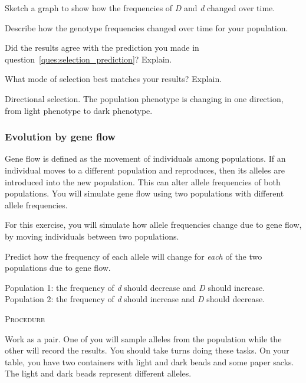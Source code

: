 \documentclass[12pt]{exam}
\newcommand*\AnswerBox[2]{%
    \parbox[t][#1]{0.92\textwidth}{%
    \begin{solution}#2\end{solution}}
    \vspace{\stretch{1}}
}
\newlength{\basespace}
\newcommand{\allele}[1]{\textit{#1}}
\begin{document}
\begin{questions}
\newpage

\question
Sketch a graph to show how the frequencies of \allele{D} and \allele{d} changed over time.

\AnswerBox{1.2\basespace}{%
}

\question
Describe how the genotype frequencies changed over time for your population.

\AnswerBox{0.8\basespace}{%
}

\question
Did the results agree with the prediction you made in question~\ref{ques:selection_prediction}? Explain.

\AnswerBox{0.8\baselineskip}{%
}

\question[Checkout]
What mode of selection best matches your results? Explain.

\AnswerBox{0\baselineskip}{Directional selection. The population phenotype is changing in one direction, from light phenotype to dark phenotype.}

\subsubsection*{Evolution by gene flow}\label{sec:gene_flow}

Gene flow is defined as the movement of individuals among populations.  If an individual moves to a different population and reproduces, then its alleles are introduced into the new population.  This can alter allele frequencies of both populations. You will simulate gene flow using two populations with different allele frequencies.

For this exercise, you will simulate how allele frequencies change due to gene flow, by moving individuals between two populations. 



\question\label{ques:migration_prediction}
Predict how the frequency of each allele will change for \emph{each} of the two populations due to gene flow. 

\AnswerBox{3\baselineskip}{Population 1: the frequency of \allele{d} should decrease and \allele{D} should increase. Population 2: the frequency of \allele{d} should increase and \allele{D} should decrease.}

\textsc{Procedure}

\medskip

Work as a pair. One of you will sample alleles from the population while the other will record the results. You should take turns doing these tasks.  On your table, you have two containers with light and dark beads and some paper sacks. The light and dark beads represent different alleles.


\end{questions}
\end{document}
